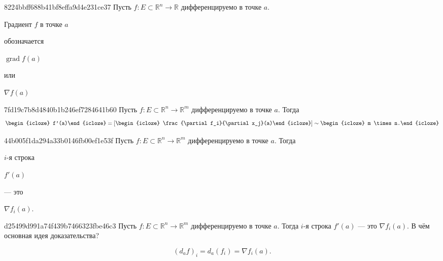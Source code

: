 \begin{note}{8224bbff688b41bf8effa9d4e231ce37}
    Пусть \({ f : E \subset \mathbb R^{n} \to \mathbb R }\) дифференцируемо в точке \({ a }\).
    \begin{icloze}{2}Градиент \({ f }\) в точке \({ a }\)\end{icloze} обозначается \begin{icloze}{1}\({ \operatorname{grad} f(a) }\)\end{icloze} или \begin{icloze}{1}\({ \nabla f(a) }\)\end{icloze}
\end{note}

\begin{note}{7fd19c7b8d4840b1b246ef7284641b60}
    Пусть \({ f : E \subset \mathbb R^{n} \to \mathbb R^{m} }\) дифференцируемо в точке \({ a }\).
    Тогда
    \[
        \begin{icloze}{3}f'(a)\end{icloze} = \left[ \begin{icloze}{1}\frac{\partial f_i}{\partial x_j}(a)\end{icloze} \right] \sim \begin{icloze}{2}m \times n.\end{icloze}
    \]
\end{note}

\begin{note}{44b005f1da294a33b0146fb00ef1e53f}
    Пусть \({ f : E \subset \mathbb R^{n} \to \mathbb R^{m} }\) дифференцируемо в точке \({ a }\).
    Тогда \begin{icloze}{2}\({ i }\)-я строка\end{icloze} \begin{icloze}{3}\({ f'(a) }\)\end{icloze} --- это \begin{icloze}{1}\({ \nabla f_i(a) }\).\end{icloze}
\end{note}

\begin{note}{d25499d991a74f439b7466323fbe46c3}
    Пусть \({ f : E \subset \mathbb R^{n} \to \mathbb R^{m} }\) дифференцируемо в точке \({ a }\).
    Тогда \({ i }\)-я строка \({ f'(a) }\) --- это \({ \nabla f_i(a) }\).
    В чём основная идея доказательства?

    \begin{cloze}{1}
        \[
            (d_{a}f)_i = d_{a}(f_i) = \nabla f_i(a).
        \]
    \end{cloze}
\end{note}

